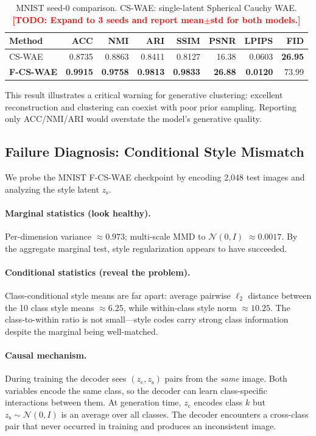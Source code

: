 \documentclass[10pt]{article}
\newcommand{\todo}[1]{\textcolor{red}{\textbf{[TODO: #1]}}}
\newcommand{\ours}{F-CS-WAE}
\newcommand{\simple}{CS-WAE}
\newcommand{\zc}{z_{\mathrm{c}}}
\newcommand{\zs}{z_{\mathrm{s}}}
\begin{document}
\begin{table}[t]
\centering
\caption{MNIST seed-0 comparison.
         \simple{}: single-latent Spherical Cauchy WAE.
         \todo{Expand to 3 seeds and report mean$\pm$std for both models.}}
\label{tab:mnist}
\begin{tabular}{lrrrrrrr}
\toprule
Method & ACC & NMI & ARI & SSIM & PSNR & LPIPS & FID \\
\midrule
\simple{}        & 0.8735 & 0.8863 & 0.8411 & 0.8127 & 16.38 & 0.0603 & \textbf{26.95} \\
\textbf{\ours{}} & \textbf{0.9915} & \textbf{0.9758} & \textbf{0.9813}
                 & \textbf{0.9833} & \textbf{26.88} & \textbf{0.0120} & 73.99 \\
\bottomrule
\end{tabular}
\end{table}

This result illustrates a critical warning for generative clustering: excellent
reconstruction and clustering can coexist with poor prior sampling.
Reporting only ACC/NMI/ARI would overstate the model's generative quality.

\subsection{Failure Diagnosis: Conditional Style Mismatch}
\label{sec:diagnosis}

We probe the MNIST \ours{} checkpoint by encoding 2{,}048 test images and analyzing
the style latent $\zs$.

\paragraph{Marginal statistics (look healthy).}
Per-dimension variance $\approx 0.973$;
multi-scale MMD to $\mathcal{N}(0,I)$ $\approx 0.0017$.
By the aggregate marginal test, style regularization appears to have succeeded.

\paragraph{Conditional statistics (reveal the problem).}
Class-conditional style means are far apart:
average pairwise $\ell_2$ distance between the 10 class style means $\approx 6.25$,
while within-class style norm $\approx 10.25$.
The class-to-within ratio is not small---style codes carry strong class information
despite the marginal being well-matched.

\paragraph{Causal mechanism.}
During training the decoder sees $(\zc,\zs)$ pairs from the \emph{same} image.
Both variables encode the same class, so the decoder can learn class-specific
interactions between them.
At generation time, $\zc$ encodes class $k$ but $\zs\sim\mathcal{N}(0,I)$ is an
average over all classes.
The decoder encounters a cross-class pair that never occurred in training and
produces an inconsistent image.
\end{document}
